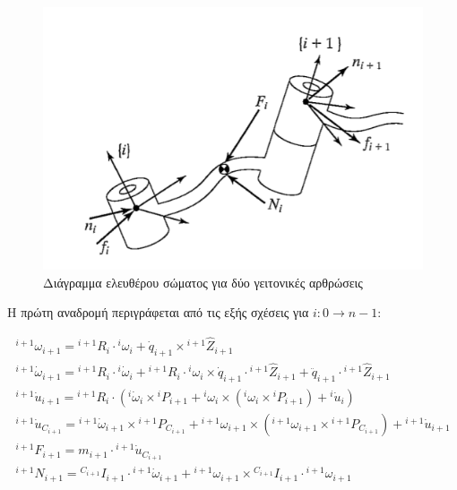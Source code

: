 \begin{figure}[H]
    \centering
    \includegraphics[width=.7\textwidth, keepaspectratio]{fig/force-balance.png}
    \caption{Διάγραμμα ελευθέρου σώματος για δύο γειτονικές αρθρώσεις \cite{craig95}}
    \label{fig:force-balance}
\end{figure}

Η πρώτη αναδρομή περιγράφεται από τις εξής σχέσεις για $i : 0 \rightarrow n-1$:

\begin{equation}
    \begin{aligned}
        ^{i+1}\omega_{i+1} = {}^{i+1}R_i \cdot {}^i\omega_i +
        \dot{q}_{i+1} \times {}^{i+1}\hat{Z}_{i+1}\\[10pt]
        ^{i+1}\dot{\omega}_{i+1} = {}^{i+1}R_i \cdot {}^i\dot{\omega}_i +
        {}^{i+1}R_i \cdot {}^i\omega_i \times \dot{q}_{i+1} \cdot
        {}^{i+1}\hat{Z}_{i+1} + \ddot{q}_{i+1} \cdot
        {}^{i+1}\hat{Z}_{i+1}\\[10pt]
        ^{i+1}\dot{u}_{i+1} = {}^{i+1}R_i \cdot (^i\dot{\omega}_i \times
        {}^iP_{i+1} + {}^i\omega_i \times (^i\omega_i \times {}^iP_{i+1}) +
        {}^i\dot{u}_i)\\[10pt]
        ^{i+1}\dot{u}_{C_{i+1}} = {}^{i+1}\dot{\omega}_{i+1} \times
        {}^{i+1}P_{C_{i+1}} + {}^{i+1}\omega_{i+1} \times (^{i+1}\omega_{i+1}
        \times {}^{i+1}P_{C_{i+1}}) + {}^{i+1}\dot{u}_{i+1}\\[10pt]
        ^{i+1}F_{i+1} = m_{i+1} \cdot {}^{i+1}\dot{u}_{C_{i+1}}\\[10pt]
        ^{i+1}N_{i+1} = {}^{C_{i+1}}I_{i+1} \cdot {}^{i+1}\dot{\omega}_{i+1} +
        {}^{i+1}\omega_{i+1} \times {}^{C_{i+1}}I_{i+1} \cdot {}^{i+1}\omega_{i+1}
    \end{aligned}
    \label{equ:iterative-NE-first}
\end{equation}

